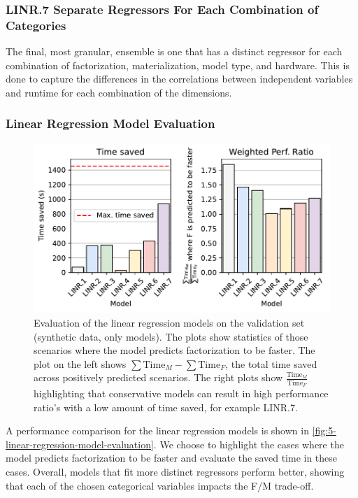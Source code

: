 \subsubsection*{LINR.7 Separate Regressors For Each Combination of Categories}
The final, most granular, ensemble is one that has a distinct regressor for each combination of factorization, materialization, model type, and hardware. This is done to capture the differences in the correlations between independent variables and runtime for each combination of the dimensions.


\subsubsection{Linear Regression Model Evaluation}
\begin{figure}[ht]
  \centering
  \includegraphics[width=0.75\linewidth]{chapters/05_cost_estimation/figures/stat-models-compare.pdf}
  \caption[Linear Regression Model Evaluation]{Evaluation of the linear regression models on the validation set (synthetic data, only models). The plots show statistics of those scenarios where the model predicts factorization to be faster. The plot on the left shows $\sum \text{Time}_M - \sum \text{Time}_F$, the total time saved across positively predicted scenarios. The right plots show $\frac{\text{Time}_M}{\text{Time}_F}$ highlighting that conservative models can result in high performance ratio's with a low amount of time saved, for example LINR.7.}
  \label{fig:5-linear-regression-model-evaluation}
\end{figure}

A performance comparison for the linear regression models is shown in \autoref{fig:5-linear-regression-model-evaluation}. We choose to highlight the cases where the model predicts factorization to be faster and evaluate the saved time in these cases. Overall, models that fit more distinct regressors perform better, showing that each of the chosen categorical variables impacts the F/M trade-off.

